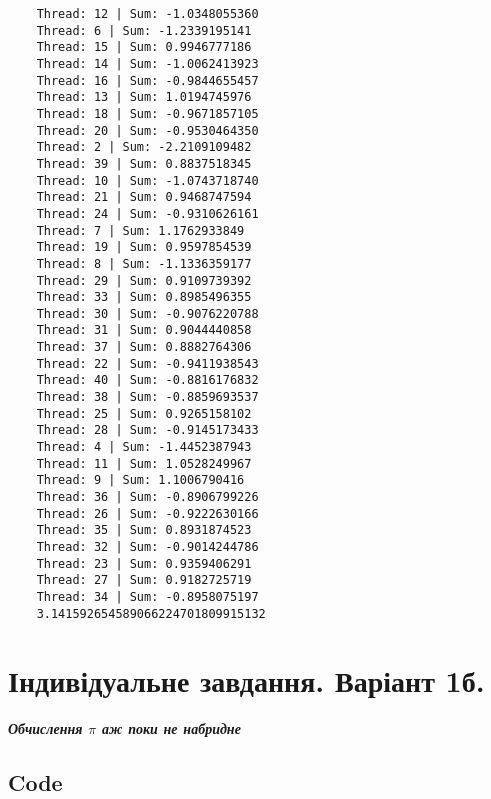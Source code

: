 \documentclass{article}
\begin{document}
\begin{enumerate}
\begin{verbatim}
	Thread: 12 | Sum: -1.0348055360
	Thread: 6 | Sum: -1.2339195141
	Thread: 15 | Sum: 0.9946777186
	Thread: 14 | Sum: -1.0062413923
	Thread: 16 | Sum: -0.9844655457
	Thread: 13 | Sum: 1.0194745976
	Thread: 18 | Sum: -0.9671857105
	Thread: 20 | Sum: -0.9530464350
	Thread: 2 | Sum: -2.2109109482
	Thread: 39 | Sum: 0.8837518345
	Thread: 10 | Sum: -1.0743718740
	Thread: 21 | Sum: 0.9468747594
	Thread: 24 | Sum: -0.9310626161
	Thread: 7 | Sum: 1.1762933849
	Thread: 19 | Sum: 0.9597854539
	Thread: 8 | Sum: -1.1336359177
	Thread: 29 | Sum: 0.9109739392
	Thread: 33 | Sum: 0.8985496355
	Thread: 30 | Sum: -0.9076220788
	Thread: 31 | Sum: 0.9044440858
	Thread: 37 | Sum: 0.8882764306
	Thread: 22 | Sum: -0.9411938543
	Thread: 40 | Sum: -0.8816176832
	Thread: 38 | Sum: -0.8859693537
	Thread: 25 | Sum: 0.9265158102
	Thread: 28 | Sum: -0.9145173433
	Thread: 4 | Sum: -1.4452387943
	Thread: 11 | Sum: 1.0528249967
	Thread: 9 | Sum: 1.1006790416
	Thread: 36 | Sum: -0.8906799226
	Thread: 26 | Sum: -0.9222630166
	Thread: 35 | Sum: 0.8931874523
	Thread: 32 | Sum: -0.9014244786
	Thread: 23 | Sum: 0.9359406291
	Thread: 27 | Sum: 0.9182725719
	Thread: 34 | Sum: -0.8958075197
	3.141592654589066224701809915132
	\end{verbatim}
\end{enumerate}
\newpage

\section{Індивідуальне завдання. Варіант 1б.}
\textbf{\textit{Обчислення $\pi$ аж поки не набридне}}
\subsection{Code}
\end{document}
